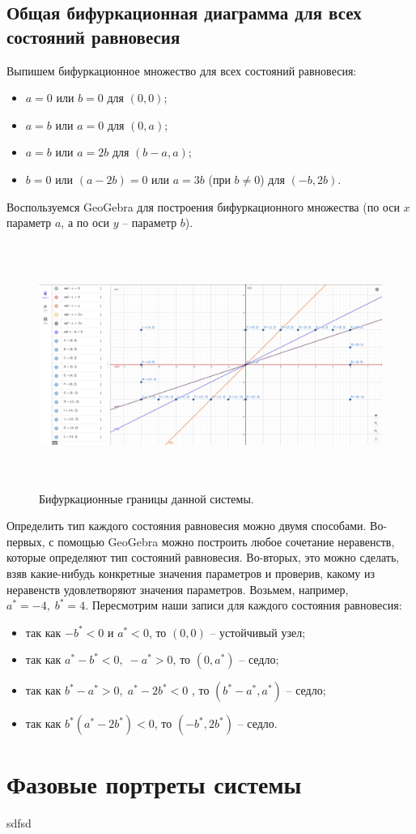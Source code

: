 \subsection{Общая бифуркационная диаграмма для всех состояний равновесия}
Выпишем бифуркационное множество для всех состояний равновесия: 
\begin{itemize}
\item{$a = 0$ или $ b = 0$ для $(0, 0)$;}
\item{$a = b$ или $ a = 0$ для $(0, a)$;}
\item{$a = b$ или $ a = 2b$ для $\left (b-a , a \right )$;}
\item{$b = 0$ или $(a-2b)=0$ или $a = 3b $ (при $b \ne 0 $)  для $ \left ( -b, 2b  \right ) $.}
\end{itemize}
Воспользуемся GeoGebra для построения бифуркационного множества (по оси $x$ параметр $a$, а по оси $y$ -- параметр $b$).
\begin{figure}[!thb]
\includegraphics[height=8cm]{bifdiag-4.png}
\centering
\caption{\label{fig:bifdiag2} Бифуркационные границы данной системы.}
\end{figure}
Определить тип каждого состояния равновесия можно двумя способами.
Во-первых, с помощью GeoGebra можно построить любое сочетание неравенств, которые определяют тип состояний равновесия.
Во-вторых, это можно сделать, взяв какие-нибудь конкретные значения параметров и проверив, какому из неравенств удовлетворяют значения параметров. 
Возьмем, например, $a^\ast = -4,\; b^\ast = 4$. 
Пересмотрим наши записи для каждого состояния равновесия: 
\begin{itemize}
\item{так как $-b^\ast < 0$ и $a^\ast < 0$, то $(0, 0)$ -- устойчивый узел;}
\item{так как $a^\ast -b^\ast < 0, \; -a^\ast > 0$, то $(0, a^\ast)$ -- седло; }
\item{так как $b^\ast-a^\ast > 0, \; a^\ast - 2b^\ast < 0$ , то $\left ( b^\ast-a^\ast , a^\ast \right )$ -- седло;}
\item{так как $b^\ast(a^\ast - 2 b^\ast) < 0$, то $  ( -b^\ast, 2b^\ast ) $ -- седло.}
\end{itemize}

\newpage
\newpage
\section{Фазовые портреты системы}
sdfsd

